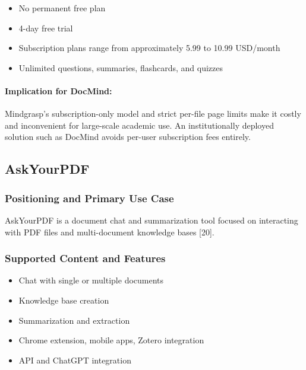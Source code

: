 \documentclass[12pt, a4paper, oneside]{report}
\let\oldsubsection\subsection
\renewcommand{\subsection}{%
  \addtocontents{toc}{\protect\needspace{3\baselineskip}}%
  \oldsubsection
}
\begin{document}
\begin{itemize}[noitemsep]
  \item No permanent free plan
  \item 4-day free trial
  \item Subscription plans range from approximately 5.99 to 10.99 USD/month
  \item Unlimited questions, summaries, flashcards, and quizzes
\end{itemize}

\paragraph{Implication for DocMind:}

Mindgrasp's subscription-only model and strict per-file page limits make it costly and inconvenient for large-scale academic use. An institutionally deployed solution such as DocMind avoids per-user subscription fees entirely.

\newpage

\subsection{AskYourPDF}

\subsubsection{Positioning and Primary Use Case}

AskYourPDF is a document chat and summarization tool focused on interacting with PDF files and multi-document knowledge bases [20].

\subsubsection{Supported Content and Features}

\begin{itemize}[noitemsep]
  \item Chat with single or multiple documents
  \item Knowledge base creation
  \item Summarization and extraction
  \item Chrome extension, mobile apps, Zotero integration
  \item API and ChatGPT integration
\end{itemize}
\end{document}
